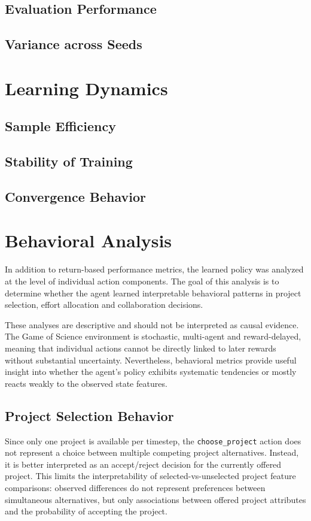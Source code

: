 \documentclass[english,bachelor]{hsluthesis}
\begin{document}
\subsection{Evaluation Performance}
\subsection{Variance across Seeds}

\section{Learning Dynamics}
\subsection{Sample Efficiency}
\subsection{Stability of Training}
\subsection{Convergence Behavior}

\section{Behavioral Analysis}

In addition to return-based performance metrics, the learned policy was analyzed at the level of individual action components. The goal of this analysis is to determine whether the agent learned interpretable behavioral patterns in project selection, effort allocation and collaboration decisions.

These analyses are descriptive and should not be interpreted as causal evidence. The Game of Science environment is stochastic, multi-agent and reward-delayed, meaning that individual actions cannot be directly linked to later rewards without substantial uncertainty. Nevertheless, behavioral metrics provide useful insight into whether the agent's policy exhibits systematic tendencies or mostly reacts weakly to the observed state features.

\subsection{Project Selection Behavior}

Since only one project is available per timestep, the \texttt{choose\_project} action does not represent a choice between multiple competing project alternatives. Instead, it is better interpreted as an accept/reject decision for the currently offered project. This limits the interpretability of selected-vs-unselected project feature comparisons: observed differences do not represent preferences between simultaneous alternatives, but only associations between offered project attributes and the probability of accepting the project.
\end{document}
